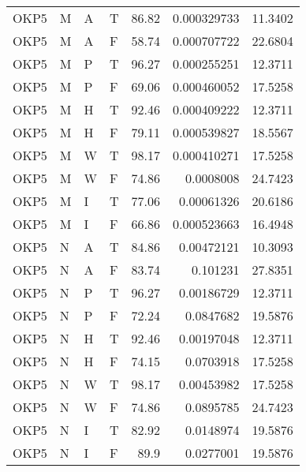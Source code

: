 \begin{tabular}{llllrrr}
    OKP5     & M     & A     & T          & 86.82      & 0.000329733 & 11.3402  \\
    OKP5     & M     & A     & F          & 58.74      & 0.000707722 & 22.6804  \\
    OKP5     & M     & P     & T          & 96.27      & 0.000255251 & 12.3711  \\
    OKP5     & M     & P     & F          & 69.06      & 0.000460052 & 17.5258  \\
    OKP5     & M     & H     & T          & 92.46      & 0.000409222 & 12.3711  \\
    OKP5     & M     & H     & F          & 79.11      & 0.000539827 & 18.5567  \\
    OKP5     & M     & W     & T          & 98.17      & 0.000410271 & 17.5258  \\
    OKP5     & M     & W     & F          & 74.86      & 0.0008008   & 24.7423  \\
    OKP5     & M     & I     & T          & 77.06      & 0.00061326  & 20.6186  \\
    OKP5     & M     & I     & F          & 66.86      & 0.000523663 & 16.4948  \\
    OKP5     & N     & A     & T          & 84.86      & 0.00472121  & 10.3093  \\
    OKP5     & N     & A     & F          & 83.74      & 0.101231    & 27.8351  \\
    OKP5     & N     & P     & T          & 96.27      & 0.00186729  & 12.3711  \\
    OKP5     & N     & P     & F          & 72.24      & 0.0847682   & 19.5876  \\
    OKP5     & N     & H     & T          & 92.46      & 0.00197048  & 12.3711  \\
    OKP5     & N     & H     & F          & 74.15      & 0.0703918   & 17.5258  \\
    OKP5     & N     & W     & T          & 98.17      & 0.00453982  & 17.5258  \\
    OKP5     & N     & W     & F          & 74.86      & 0.0895785   & 24.7423  \\
    OKP5     & N     & I     & T          & 82.92      & 0.0148974   & 19.5876  \\
    OKP5     & N     & I     & F          & 89.9       & 0.0277001   & 19.5876  \\
    \hline
\end{tabular}